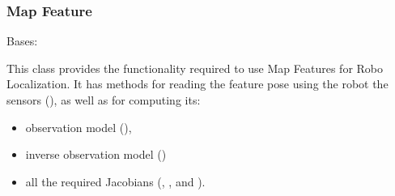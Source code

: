 \documentclass[letterpaper,10pt,english]{sphinxmanual}
\begin{document}
\subsubsection{Map Feature}
\label{\detokenize{FEKFMBLocalization:map-feature}}
\begin{figure}[htbp]
\centering

\noindent{}
\end{figure}

\begin{fulllineitems}
\label{\detokenize{FEKFMBLocalization:MapFeature.MapFeature}}
\pysigstartsignatures
{}
\pysigstopsignatures
\sphinxAtStartPar
Bases: 

\sphinxAtStartPar
This class provides the functionality required to use Map Features for Robo Localization. It has methods for reading
the feature pose using the robot the sensors ({\hyperref[\detokenize{FEKFMBLocalization:MapFeature.MapFeature.GetFeatures}]{}}), as well as for computing its:
\begin{itemize}
\item {} 
\sphinxAtStartPar
observation model  ({\hyperref[\detokenize{FEKFMBLocalization:MapFeature.MapFeature.hf}]{}}),

\item {} 
\sphinxAtStartPar
inverse observation model ({\hyperref[\detokenize{FEKFMBLocalization:MapFeature.MapFeature.g}]{}})

\item {} 
\sphinxAtStartPar
all the required Jacobians ({\hyperref[\detokenize{FEKFMBLocalization:MapFeature.MapFeature.Jhfx}]{}}, {\hyperref[\detokenize{FEKFMBLocalization:MapFeature.MapFeature.Jhfv}]{}}, {\hyperref[\detokenize{FEKFMBLocalization:MapFeature.MapFeature.Jgx}]{}} and {\hyperref[\detokenize{FEKFMBLocalization:MapFeature.MapFeature.Jgv}]{}}).


\end{itemize}
\end{fulllineitems}
\end{document}
